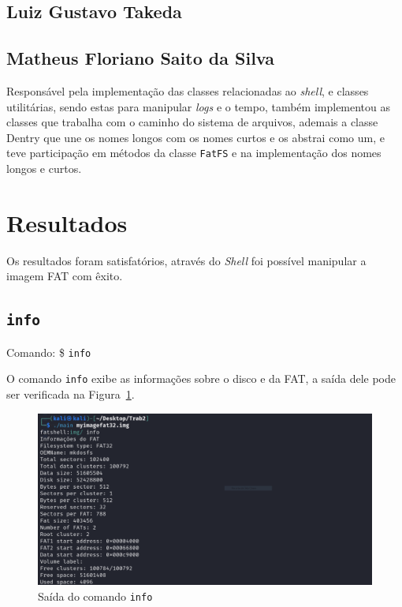 \documentclass[
    12pt,				%
    oneside,   	        %
    a4paper,			%
    english,			%
    french,				%
    spanish,			%
    brazil,				%
    ]{pacotes/abntex2}
\begin{document}
\subsection{Luiz Gustavo Takeda}
\label{subsec:luizinho}

\subsection{Matheus Floriano Saito da Silva}
\label{subsec:peixoto}
Responsável pela implementação das classes relacionadas ao \textit{shell}, e classes utilitárias, sendo estas para manipular \textit{logs} e o tempo, também implementou as classes que trabalha com o caminho do sistema de arquivos, ademais a classe Dentry que une os nomes longos com os nomes curtos e os abstrai como um, e teve participação em métodos da classe \texttt{FatFS} e na implementação dos nomes longos e curtos.



\graphicspath{ {./figuras/resultados} }

\section{Resultados}
\label{sec:resultados}
Os resultados foram satisfatórios, através do \textit{Shell} foi possível manipular a imagem FAT com êxito.


\subsection{\texttt{info}}
\label{subsec:info}
Comando: \$ \texttt{info}
 
O comando \texttt{info} exibe as informações sobre o disco e da FAT, a saída dele pode ser verificada na Figura~\ref{fig:info}.

\begin{figure}[H]
    \centering
    \includegraphics[width=450pt]{0-info.PNG}
    \caption{Saída do comando \texttt{info}}
    \label{fig:info}
\end{figure}
\end{document}
